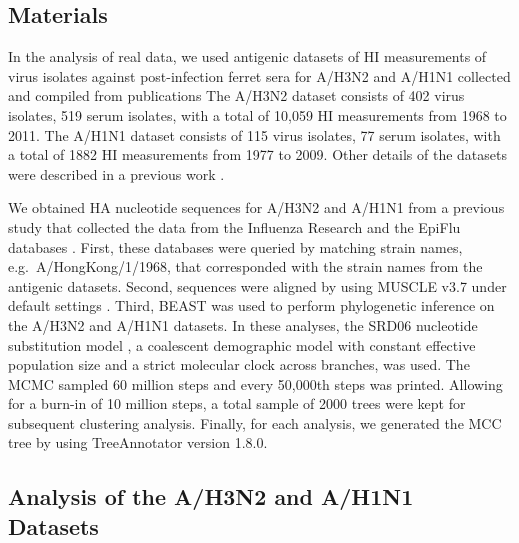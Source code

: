 \documentclass[11pt,oneside,letterpaper]{article}
\begin{document}




\subsection*{Materials}


In the analysis of real data, we used antigenic datasets \cite{bedford_integrating_2014} of HI measurements of virus isolates against post-infection ferret sera for A/H3N2 and A/H1N1 collected and compiled from publications \cite{Smith04,Kendal78,Webster79,Nakajima79,Nakajima81,Chakraverty82,Pereira82,Chakraverty86,Cox83,Daniels85,Raymond86,Stevens87,Donatelli93,Hay01,Daum02,McDonald07,Barr10}
The A/H3N2 dataset consists of 402 virus isolates, 519 serum isolates, with a total of 10,059 HI measurements from 1968 to 2011. 
The A/H1N1 dataset consists of 115 virus isolates, 77 serum isolates, with a total of 1882 HI measurements from 1977 to 2009.
Other details of the datasets were described in a previous work \cite{bedford_integrating_2014}.

We obtained HA nucleotide sequences for A/H3N2 and A/H1N1 from a previous study \cite{bedford_integrating_2014} that collected the data from the Influenza Research \cite{IRD} and the EpiFlu databases \cite{GISAID}. 
First, these databases were queried by matching strain names, e.g.\ A/HongKong/1/1968, that corresponded with the strain names from the antigenic datasets.
Second, sequences were aligned by using MUSCLE v3.7 under default settings \cite{MUSCLE}.
Third, BEAST\cite{BEAST17} was used to perform phylogenetic inference on the A/H3N2 and A/H1N1 datasets.
In these analyses, the SRD06 nucleotide substitution model \cite{Shapiro06}, a coalescent demographic model with constant effective population size and a strict molecular clock across branches, was used.
The MCMC sampled 60 million steps and every 50,000th steps was printed.
Allowing for a burn-in of 10 million steps, a total sample of 2000 trees were kept for subsequent clustering analysis.
Finally, for each analysis, we generated the MCC tree by using TreeAnnotator version 1.8.0.





\subsection*{Analysis of the A/H3N2 and A/H1N1 Datasets}
\end{document}
